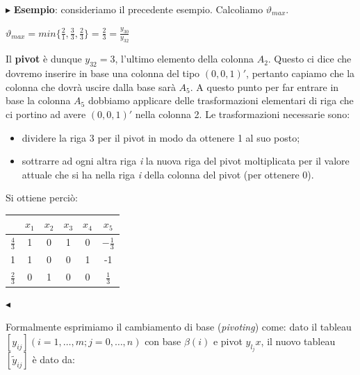 \documentclass[11pt]{book}
\begin{document}
\vspace{11pt}
$\blacktriangleright$ {\bf Esempio}: consideriamo il precedente
esempio. Calcoliamo $\vartheta_{max}$.

\begin{center}
$\vartheta_{max} = min \biggr\{ \frac{2}{1},\frac{3}{3},\frac{2}{3}
  \biggr\} = \frac{2}{3} = \frac{y_{30}}{y_{32}}$  
\end{center}

Il {\bf pivot} \`e dunque $y_{32} = 3$, l'ultimo elemento della
colonna $A_2$. Questo ci dice che dovremo inserire in base una colonna
del tipo $(0,0,1)'$, pertanto capiamo che la colonna che dovr\`a uscire
dalla base sar\`a $A_5$. A questo punto per far entrare in base la
colonna $A_5$ dobbiamo applicare delle trasformazioni elementari di
riga che ci portino ad avere $(0,0,1)'$ nella colonna 2. Le
trasformazioni necessarie sono:

\begin{itemize}

\item dividere la riga 3 per il pivot in modo da ottenere 1 al suo
  posto;

\item sottrarre ad ogni altra riga {\em i} la nuova riga del pivot
  moltiplicata per il valore attuale che si ha nella riga {\em i}
  della colonna del pivot (per ottenere 0).

\end{itemize}

Si ottiene perci\`o:

\begin{center}
  \begin{tabular}{c|ccccc}
    & $x_1$ & $x_2$ & $x_3$ & $x_4$ & $x_5$ \\\hline
    $\frac{4}{3}$ & 1 & 0 & 1 & 0 & $-\frac{1}{3}$ \\
    1 & 1 & 0& 0 & 1& -1 \\
    $\frac{2}{3}$ & 0 & 1 & 0 & 0 & $\frac{1}{3}$ \\
  \end{tabular}
\end{center}

$\blacktriangleleft$
\linebreak\vspace{11pt}

Formalmente esprimiamo il cambiamento di base ({\em pivoting}) come:
dato il tableau $[y_{ij}] (i=1,\dots,m; j=0,\dots,n)$ con base
$\beta(i)$ e pivot $y_{l_j}x$, il nuovo tableau $[\tilde{y}_{ij}]$ \`e
dato da:
\end{document}

